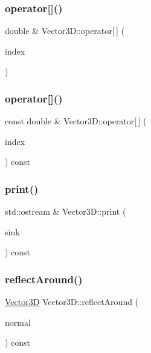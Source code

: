 \subsubsection{\texorpdfstring{operator[]()}{operator[]()}\hspace{0.1cm}{\footnotesize\ttfamily [1/2]}}
{\footnotesize\ttfamily double \& Vector3\+D\+::operator\mbox{[}$\,$\mbox{]} (\begin{DoxyParamCaption}\item[{unsigned int}]{index }\end{DoxyParamCaption})}

\mbox{\label{classVector3D_acd83f7d07b4730cce2031ae0576095ac}} 
\subsubsection{\texorpdfstring{operator[]()}{operator[]()}\hspace{0.1cm}{\footnotesize\ttfamily [2/2]}}
{\footnotesize\ttfamily const double \& Vector3\+D\+::operator\mbox{[}$\,$\mbox{]} (\begin{DoxyParamCaption}\item[{unsigned int}]{index }\end{DoxyParamCaption}) const}

\mbox{\label{classVector3D_a52019f23a845a14b8732fdd5a6ca2c16}} 
\subsubsection{\texorpdfstring{print()}{print()}}
{\footnotesize\ttfamily std\+::ostream \& Vector3\+D\+::print (\begin{DoxyParamCaption}\item[{std\+::ostream \&}]{sink }\end{DoxyParamCaption}) const\hspace{0.3cm}{\ttfamily [private]}}

\mbox{\label{classVector3D_a513a9bac97abe00e020d1b032fdf9d21}} 
\subsubsection{\texorpdfstring{reflectAround()}{reflectAround()}}
{\footnotesize\ttfamily \mbox{\hyperlink{classVector3D}{Vector3D}} Vector3\+D\+::reflect\+Around (\begin{DoxyParamCaption}\item[{const \mbox{\hyperlink{classVector3D}{Vector3D}} \&}]{normal }\end{DoxyParamCaption}) const}

